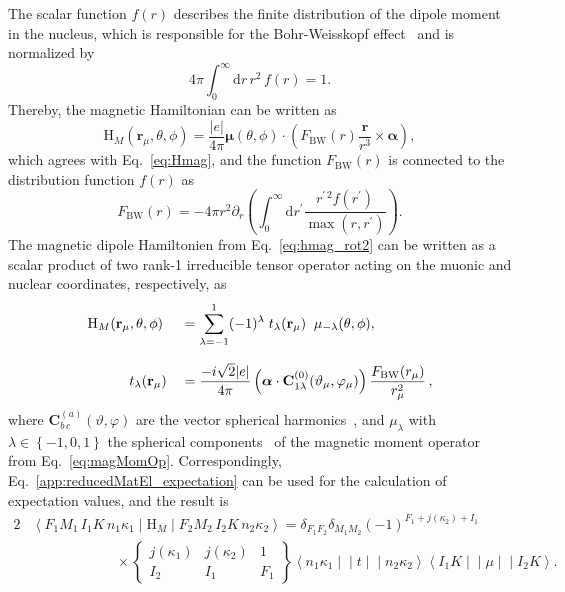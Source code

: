 The scalar function $f(r)$ describes the finite distribution of the dipole moment in the nucleus, which is responsible for the Bohr-Weisskopf effect~\cite{bohrWeisskopf1950} and is normalized by
\begin{equation}
4\pi\int_0^\infty \text{d}r\,r^2\,f(r)=1.
\end{equation}
Thereby, the magnetic Hamiltonian can be written as
\begin{equation}
\label{eq:hmag_rot2}
\text{H}_M(\mathbf{r}_\mu,\theta,\phi) =\frac{|e|}{4\pi}\boldsymbol{\mu}(\theta,\phi)\cdot
\left( F_{\text{BW}}(r)\frac{\mathbf{r}}{r^3}\times \boldsymbol{\alpha}\right),
\end{equation}
which agrees with Eq.~\eqref{eq:Hmag}, and the function $F_{\text{BW}}(r)$ is connected to the distribution function $f(r)$ as
\begin{equation}
F_{\text{BW}}(r)=-4\pi r^2\partial_r \left(\int_0^\infty\text{d}r^\prime \frac{r^{\prime\,2}f(r^\prime)}{\max (r,r^\prime)}\right).
\end{equation}
The magnetic dipole Hamiltonien from Eq.~\eqref{eq:hmag_rot2} can be written as a scalar product of two rank-1 irreducible tensor operator acting on the muonic and nuclear coordinates, respectively, as~\cite{johnson2007}
\begin{alignat}{2}
&\text{H}_M  (\mathbf{r}_\mu,\theta,\phi) &&=\sum_{\lambda=-1}^1 (-1)^\lambda \;t_\lambda(\mathbf{r}_\mu) \;\;\mu_{-\lambda}(\theta,\phi),\notag\\[7.5pt]
&\qquad \quad t_\lambda(\mathbf{r}_\mu) &&= \frac{-i\sqrt{2}|e|}{4\pi}\left(\boldsymbol{\alpha}\cdot\mathbf{C}^{(0)}_{1\lambda}(\vartheta_\mu,\varphi_\mu)\right)\frac{F_{\text{BW}}(r_\mu)}{r_\mu^2}\,\notag,
\end{alignat}
where $\mathbf{C}^{(a)}_{b\,c}(\vartheta,\varphi)$ are the vector spherical harmonics~\cite[Section 7.]{varshalovich1988}, and $\mu_\lambda$ with $\lambda \in \left\{-1,0,1\right\}$ the spherical components~\cite[Section 1.]{varshalovich1988} of the magnetic moment operator from Eq.~\eqref{eq:magMomOp}. Correspondingly, Eq.~\eqref{app:reducedMatEl_expectation} can be used for the calculation of expectation values, and the result is
\begin{alignat}{2}
& \left<F_1M_1\,I_1K\,n_1\kappa_1 \middle|\text{H}_M \middle|F_2M_2\,I_2K\,n_2\kappa_2 \right> = \delta_{F_1F_2}\delta_{M_1M_2}(-1)^{F_1+j(\kappa_2)+I_1}\\[7.5pt]
&\qquad\qquad\qquad\times
\begin{Bmatrix}
j(\kappa_1)&j(\kappa_2)&1\\
I_2&I_1&F_1
\end{Bmatrix}
\left< n_1\kappa_1\middle|\middle|t \middle|\middle| n_2\kappa_2\right>
\left< I_1K\middle|\middle|\mu \middle|\middle|I_2K\right>.
\end{alignat}
